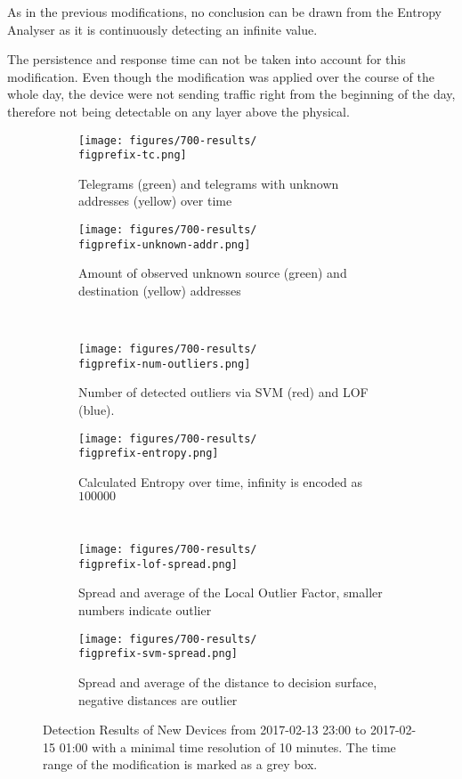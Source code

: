 As in the previous modifications, no conclusion can be drawn from the Entropy Analyser as it is continuously detecting an infinite value.

The persistence and response time can not be taken into account for this modification. Even though the modification was applied over the course of the whole day, the device were not sending traffic right from the beginning of the day, therefore not being detectable on any layer above the physical.

\begin{figure}[H]
	\newcommand{\figwith}{0.49\textwidth}
	\newcommand{\figprefix}{newdevice}
	\centering
	
	\begin{subfigure}[b]{\figwith}
		\texttt{[image: figures/700-results/\\figprefix-tc.png]}
		\caption{Telegrams (green) and telegrams with unknown addresses (yellow) over time}
		\label{fig:results:\figprefix:tc}
	\end{subfigure}
	\hfil
	\begin{subfigure}[b]{\figwith}
		\texttt{[image: figures/700-results/\\figprefix-unknown-addr.png]}
		\caption{Amount of observed unknown source (green) and destination (yellow) addresses}
		\label{fig:results:\figprefix:addr}
	\end{subfigure}
	\\[1.5mm]
	\begin{subfigure}[b]{\figwith}
		\texttt{[image: figures/700-results/\\figprefix-num-outliers.png]}
		\caption{Number of detected outliers via SVM (red) and LOF (blue).}
		\label{fig:results:\figprefix:outlier}
	\end{subfigure}
	\hfil
	\begin{subfigure}[b]{\figwith}
		\texttt{[image: figures/700-results/\\figprefix-entropy.png]}
		\caption{Calculated Entropy over time, infinity is encoded as $100 000$}
		\label{fig:results:\figprefix:entropy}
	\end{subfigure}
	\\[1.5mm]
	\begin{subfigure}[b]{\figwith}
		\texttt{[image: figures/700-results/\\figprefix-lof-spread.png]}
		\caption{Spread and average of the Local Outlier Factor, smaller numbers indicate outlier}
		\label{fig:results:\figprefix:lof}
	\end{subfigure}
	\hfil
	\begin{subfigure}[b]{\figwith}
		\texttt{[image: figures/700-results/\\figprefix-svm-spread.png]}
		\caption{Spread and average of the distance to decision surface, negative distances are outlier}
		\label{fig:results:\figprefix:svm}
	\end{subfigure}
	
	\caption[Detection Results of New Devices]{Detection Results of New Devices from 2017-02-13 23:00 to 2017-02-15 01:00 with a minimal time resolution of 10 minutes. The time range of the modification is marked as a grey box.}
	\label{fig:results:\figprefix}
	
\end{figure}

